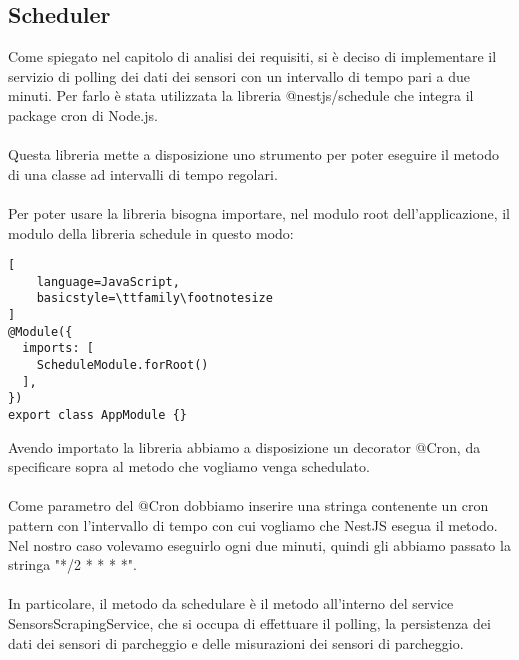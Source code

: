 \subsection{Scheduler}
Come spiegato nel capitolo di analisi dei requisiti, si è deciso di implementare il servizio di polling dei dati
dei sensori con un intervallo di tempo pari a due minuti. Per farlo è stata utilizzata
la libreria @nestjs/schedule che integra il package cron di Node.js.
\\\\
Questa libreria mette a disposizione uno strumento per poter eseguire il metodo
di una classe ad intervalli di tempo regolari.
\\\\
Per poter usare la libreria bisogna importare, nel modulo root dell'applicazione, il modulo della libreria schedule in questo modo:
\begin{lstlisting}[
    language=JavaScript,
    basicstyle=\ttfamily\footnotesize
]
@Module({
  imports: [
    ScheduleModule.forRoot()
  ],
})
export class AppModule {}
\end{lstlisting}
\leavevmode\newline
Avendo importato la libreria abbiamo a disposizione un decorator @Cron, da specificare sopra al metodo che vogliamo venga 
schedulato. 
\\\\
Come parametro del @Cron dobbiamo inserire una stringa contenente un cron pattern con
l'intervallo di tempo con cui vogliamo che NestJS esegua il metodo.
\\
Nel nostro caso volevamo eseguirlo ogni due minuti, quindi gli abbiamo passato la stringa "*/2 * * * *".
\\\\
In particolare, il metodo da schedulare è il metodo all'interno del service SensorsScrapingService, che si occupa
di effettuare il polling, la persistenza dei dati dei sensori di parcheggio e delle misurazioni dei sensori di parcheggio.

